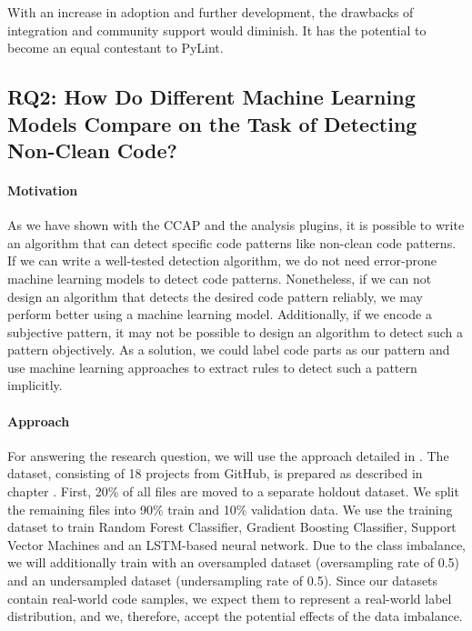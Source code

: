 With an increase in adoption and further development, the drawbacks of integration and community support would diminish. It has the potential to become an equal contestant to PyLint.

\subsection{RQ2: How Do Different Machine Learning Models Compare on the Task of Detecting Non-Clean Code?}\label{rq:2}
\paragraph{Motivation}
As we have shown with the CCAP and the analysis plugins, it is possible to write an algorithm that can detect specific code patterns like non-clean code patterns. If we can write a well-tested detection algorithm, we do not need error-prone machine learning models to detect code patterns. Nonetheless, if we can not design an algorithm that detects the desired code pattern reliably, we may perform better using a machine learning model. Additionally, if we encode a subjective pattern, it may not be possible to design an algorithm to detect such a pattern objectively. As a solution, we could label code parts as our pattern and use machine learning approaches to extract rules to detect such a pattern implicitly.


\paragraph{Approach}\label{par:approach}
For answering the research question, we will use the approach detailed in .  The dataset, consisting of 18 projects from GitHub, is prepared as described in chapter . First, 20\% of all files are moved to a separate holdout dataset. We split the remaining files into 90\% train and 10\% validation data. We use the training dataset to train Random Forest Classifier, Gradient Boosting Classifier, Support Vector Machines and an LSTM-based neural network. Due to the class imbalance, we will additionally train with an oversampled dataset (oversampling rate of 0.5) and an undersampled dataset (undersampling rate of 0.5). Since our datasets contain real-world code samples, we expect them to represent a real-world label distribution, and we, therefore, accept the potential effects of the data imbalance. 

